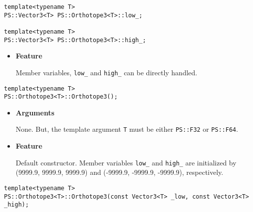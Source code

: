 
\begin{screen}
\begin{verbatim}
template<typename T>
PS::Vector3<T> PS::Orthotope3<T>::low_;

template<typename T>
PS::Vector3<T> PS::Orthotope3<T>::high_;
\end{verbatim}
\end{screen}

\begin{itemize}
  
\item{{\bf Feature}}
  
Member variables, \texttt{low\_} and \texttt{high\_} can be directly handled.
  
\end{itemize}


\begin{screen}
\begin{verbatim}
template<typename T>
PS::Orthotope3<T>::Orthotope3();
\end{verbatim}
\end{screen}

\begin{itemize}

\item{{\bf Arguments}}

None. But, the template argument \texttt{T} must be either \texttt{PS::F32} or \texttt{PS::F64}.

\item{{\bf Feature}}

Default constructor.
Member variables \texttt{low\_} and \texttt{high\_} are initialized by (9999.9, 9999.9, 9999.9) and (-9999.9, -9999.9, -9999.9), respectively.

\end{itemize}
\begin{screen}
\begin{verbatim}
template<typename T>
PS::Orthotope3<T>::Orthotope3(const Vector3<T> _low, const Vector3<T> _high);
\end{verbatim}
\end{screen}

